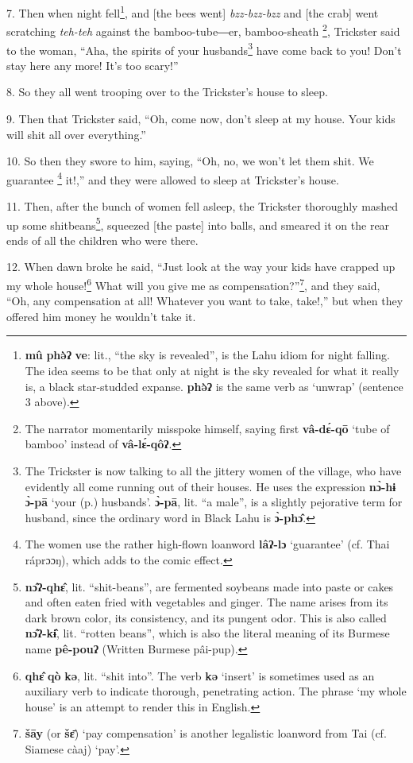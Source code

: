 7. Then when night fell\footnote{\textbf{mû} \textbf{phə̀ʔ} \textbf{ve}: lit., ``the sky is revealed'', is the Lahu idiom for night falling. The idea seems to be that only at night is the sky revealed for what it really is, a black star-studded expanse. \textbf{phə̀ʔ} is the same verb as `unwrap' (sentence 3 above).}, and [the bees went] \textit{bzz-bzz-bzz }and [the
crab] went scratching \textit{teh-teh }against the bamboo-tube―er, bamboo-sheath
\footnote{The narrator momentarily misspoke himself, saying first \textbf{vâ-dɛ́-qō} `tube of bamboo' instead of \textbf{vâ-lɛ́-qôʔ}.}, Trickster said to the woman, ``Aha, the spirits of your husbands\footnote{The Trickster is now talking to all the jittery women of the village, who have evidently all come running out of their houses. He uses the expression \textbf{nɔ̀-hɨ} \textbf{ɔ̀-pā} `your (p.) husbands'. \textbf{ɔ̀-pā}, lit. ``a male'', is a slightly pejorative term for husband, since the ordinary word in Black Lahu is \textbf{ɔ̀-phɔ̂}.} have
come back to you! Don't stay here any more! It's too scary!''

8. So they all went trooping over to the Trickster's house to sleep.

9. Then that Trickster said, ``Oh, come now, don't sleep at my house. Your kids
will shit all over everything.''

10. So then they swore to him, saying, ``Oh, no, we won't let them shit. We guarantee
\footnote{The women use the rather high-flown loanword \textbf{lâʔ-lɔ} `guarantee' (cf. Thai ráprɔɔŋ), which adds to the comic effect.} it!,'' and they were allowed to sleep at Trickster's house.

11. Then, after the bunch of women fell asleep, the Trickster thoroughly mashed
up some shitbeans\footnote{\textbf{nɔ̂ʔ-qhɛ̂}, lit. ``shit-beans'', are fermented soybeans made into paste or cakes and often eaten fried with vegetables and ginger. The name arises from its dark brown color, its consistency, and its pungent odor. This is also called \textbf{nɔ̂ʔ-kɨ̂}, lit. ``rotten beans'', which is also the literal meaning of its Burmese name \textbf{pê-pouʔ} (Written Burmese pâi-pup).}, squeezed [the paste] into balls, and smeared it on the
rear ends of all the children who were there.

12. When dawn broke he said, ``Just look at the way your kids have crapped up my
whole house!\footnote{\textbf{qhɛ̂} \textbf{qò} \textbf{kə}, lit. ``shit into''. The verb \textbf{kə} `insert' is sometimes used as an auxiliary verb to indicate thorough, penetrating action. The phrase `my whole house' is an attempt to render this in English.} What will you give me as compensation?''\footnote{\textbf{šāy} (or \textbf{šɛ̄}) `pay compensation' is another legalistic loanword from Tai (cf. Siamese càaj) `pay'.}, and they said,
``Oh, any compensation at all! Whatever you want to take, take!,'' but when they
offered him money he wouldn't take it.

